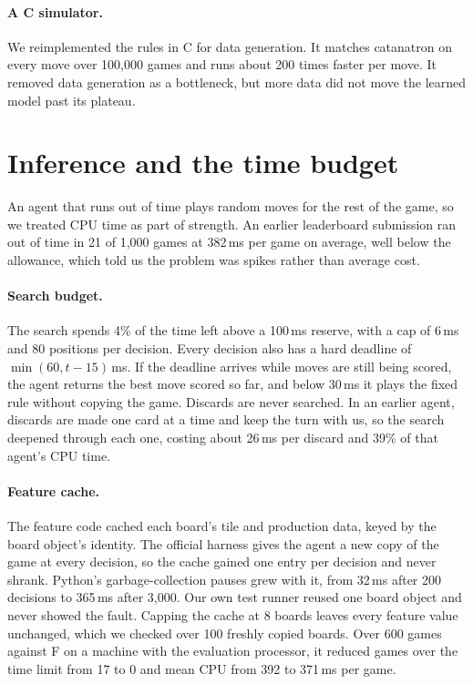 \documentclass[11pt,a4paper]{article}
\begin{document}
\paragraph{A C simulator.} We reimplemented the rules in C for data generation. It matches catanatron on every move
over 100,000 games and runs about 200 times faster per move. It removed data generation as a bottleneck, but more
data did not move the learned model past its plateau.

\section{Inference and the time budget}\label{sec:inf}
An agent that runs out of time plays random moves for the rest of the game, so we treated CPU time as part of
strength. An earlier leaderboard submission ran out of time in 21 of 1,000 games at 382\,ms per game on average,
well below the allowance, which told us the problem was spikes rather than average cost.

\paragraph{Search budget.} The search spends 4\% of the time left above a 100\,ms reserve, with a cap of 6\,ms and 80
positions per decision. Every decision also has a hard deadline of $\min(60, t-15)$\,ms. If the deadline arrives
while moves are still being scored, the agent returns the best move scored so far, and below 30\,ms it plays the fixed
rule without copying the game. Discards are never searched. In an earlier agent, discards are made one card at a time
and keep the turn with us, so the search deepened through each one, costing about 26\,ms per discard and 39\% of that
agent's CPU time.

\paragraph{Feature cache.} The feature code cached each board's tile and production data, keyed by the board object's
identity. The official harness gives the agent a new copy of the game at every decision, so the cache gained one
entry per decision and never shrank. Python's garbage-collection pauses grew with it, from 32\,ms after 200 decisions
to 365\,ms after 3,000. Our own test runner reused one board object and never showed the fault. Capping the cache at 8
boards leaves every feature value unchanged, which we checked over 100 freshly copied boards. Over 600 games against F
on a machine with the evaluation processor, it reduced games over the time limit from 17 to 0 and mean CPU from 392 to
371\,ms per game.
\end{document}
